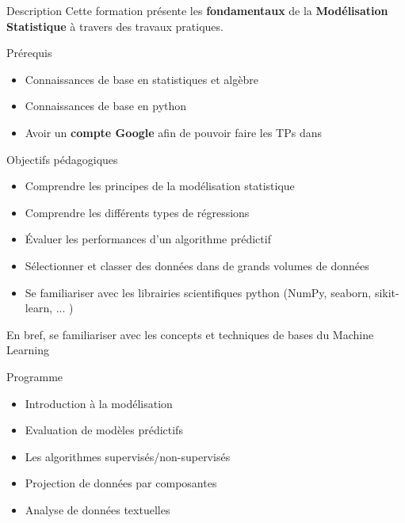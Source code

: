 
\begin{frame}{Description}
  Cette formation présente les \textbf{fondamentaux} de la \textbf{Modélisation Statistique} à travers des travaux pratiques.
\end{frame}

\begin{frame}{Prérequis}
  \begin{itemize}
  \item Connaissances de base en statistiques et algèbre
  \item Connaissances de base en python
  \item Avoir un \textbf{compte Google} afin de pouvoir faire les TPs dans 
  \end{itemize}
\end{frame}

\begin{frame}{Objectifs pédagogiques}
  \begin{itemize}
  \item Comprendre les principes de la modélisation statistique
  \item Comprendre les différents types de régressions
  \item Évaluer les performances d'un algorithme prédictif
  \item Sélectionner et classer des données dans de grands volumes de données
  \item Se familiariser avec les librairies scientifiques python (NumPy, seaborn, sikit-learn, ... )
  \end{itemize}
  En bref, se familiariser avec les concepts et techniques de bases du \og{}Machine Learning\fg
\end{frame}

\begin{frame}{Programme}
  \begin{itemize}
  \item Introduction à la modélisation
  \item Evaluation de modèles prédictifs
  \item Les algorithmes supervisés/non-supervisés
  \item Projection de données par composantes
  \item Analyse de données textuelles
  \end{itemize}
\end{frame}
